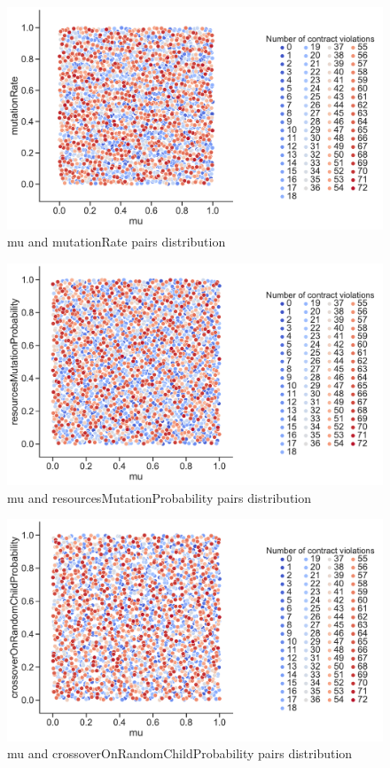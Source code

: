 \begin{figure}
	\centering
	\includegraphics[width=\textwidth]{images/PairsDistr/mu_mutationRate.pdf}
	\caption[mu and mutationRate pairs distribution]{mu and mutationRate pairs distribution}
	\label{fig:mu_mutationRate_pair}
\end{figure}
\clearpage
\begin{figure}
	\centering
	\includegraphics[width=\textwidth]{images/PairsDistr/mu_resourcesMutationProbability.pdf}
	\caption[mu and resourcesMutationProbability pairs distribution]{mu and resourcesMutationProbability pairs distribution}
	\label{fig:mu_resourcesMutationProbability_pair}
\end{figure}
\clearpage
\begin{figure}
	\centering
	\includegraphics[width=\textwidth]{images/PairsDistr/mu_crossoverOnRandomChildProbability.pdf}
	\caption[mu and crossoverOnRandomChildProbability pairs distribution]{mu and crossoverOnRandomChildProbability pairs distribution}
	\label{fig:mu_crossoverOnRandomChildProbability_pair}
\end{figure}
